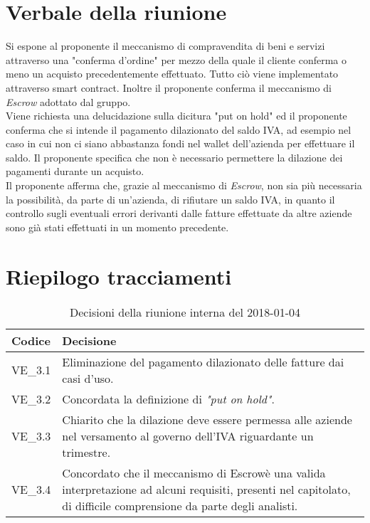 \section{Verbale della riunione}
Si espone al proponente il meccanismo di compravendita di beni e servizi attraverso
una "conferma d'ordine\glo" per mezzo della quale il cliente conferma o meno un acquisto precedentemente effettuato.
Tutto ciò viene implementato attraverso smart contract\glo{}. Inoltre il proponente
conferma il meccanismo di \textit{Escrow\glo{}} adottato dal gruppo. \\
Viene richiesta una delucidazione sulla dicitura "put on hold" ed il proponente conferma
che si intende il pagamento dilazionato del saldo IVA, ad esempio nel caso in cui non 
ci siano abbastanza fondi nel wallet\glo{} dell'azienda per effettuare il saldo. 
Il proponente specifica che non è necessario permettere la dilazione dei pagamenti durante un acquisto. \\
Il proponente afferma che, grazie al meccanismo di \textit{Escrow\glo{}}, non sia più necessaria la possibilità, da parte di un'azienda, di rifiutare un saldo IVA, in quanto il controllo sugli eventuali errori derivanti dalle fatture effettuate da altre aziende sono già stati effettuati in un momento precedente.

\pagebreak

\section{Riepilogo tracciamenti}

	
\begin{longtable}{ >{\centering}p{} >{}p{}}
	\caption{Decisioni della riunione interna del 2018-01-04}\\	
	\rowcolorhead
	\textbf{\color{white}Codice} 
	& \centering\textbf{\color{white}Decisione} 
	\tabularnewline 
	\endfirsthead
		VE\_3.1 & Eliminazione del pagamento dilazionato delle fatture dai casi d'uso.
		
		\tabularnewline 
		VE\_3.2 & Concordata la definizione di \textit{"put on hold"}.
		
		\tabularnewline 
		VE\_3.3 & Chiarito che la dilazione deve essere permessa alle aziende nel versamento al governo dell'IVA riguardante un trimestre.
		\tabularnewline 
		VE\_3.4 & Concordato che il meccanismo di Escrow\glosp è una valida interpretazione ad alcuni requisiti, presenti nel capitolato\glo, di difficile comprensione da parte degli analisti.

		
	\end{longtable}
	


